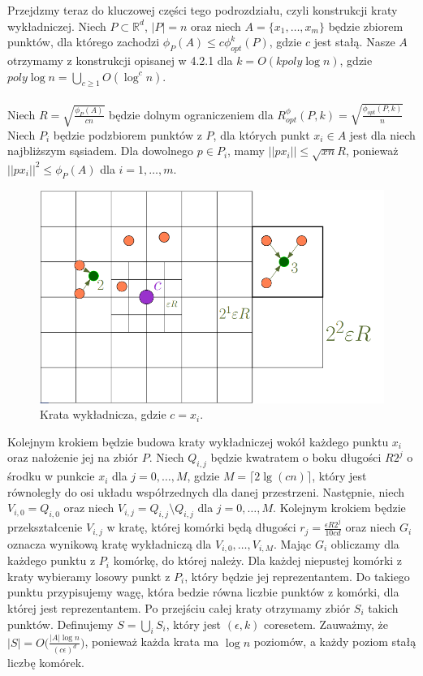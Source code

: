 Przejdzmy teraz do kluczowej części tego podrozdziału, czyli konstrukcji kraty wykładniczej.
Niech $P \subset \mathbb{R}^d$, $|P| = n$ oraz niech $A = \{x_{1}, \dots, x_{m}\}$ będzie zbiorem punktów, dla którego zachodzi $\phi_{P}(A) \leq c\phi_{opt}^{k}(P)$, gdzie $c$ jest stałą.
Nasze $A$ otrzymamy z konstrukcji opisanej w 4.2.1 dla $k = O(k poly \log n)$, gdzie $poly \log n = \bigcup_{c \geq 1} O(\log^{c}n)$.
\\~\\
Niech $R = \sqrt{\frac{\phi_{P}(A)}{cn}}$ będzie dolnym ograniczeniem dla $R_{opt}^{\phi}(P, k) = \sqrt{\frac{\phi_{opt}(P, k)}{n}}$
Niech $P_{i}$ będzie podzbiorem punktów z $P$, dla których punkt $x_{i} \in A$ jest dla niech najbliższym sąsiadem. 
Dla dowolnego $p \in P_{i}$, mamy $||px_{i}|| \leq \sqrt{xn}R$, ponieważ $||px_{i}||^{2} \leq \phi_{P}(A)$ dla $i = 1, \dots, m$.
\begin{figure}[H]
    \centering
    \includegraphics[totalheight=4cm]{grid.png}
    \caption{Krata wykładnicza, gdzie $c = x_{i}$.}
\end{figure}
\noindent
Kolejnym krokiem będzie budowa kraty wykładniczej wokół każdego punktu $x_{i}$ oraz nałożenie jej na zbiór $P$.
Niech $Q_{i,j}$ będzie kwatratem o boku długości $R2^{j}$ o środku w punkcie $x_{i}$ dla $j = 0, \dots, M$, gdzie $M = \lceil 2 \lg(cn) \rceil$, który jest równoległy do osi układu współrzednych dla danej przestrzeni.
Następnie, niech $V_{i, 0} = Q_{i, 0}$ oraz niech $V_{i,j} = Q_{i,j} \setminus Q_{i,j}$ dla $j = 0, \dots, M$.
Kolejnym krokiem będzie przekształcenie $V_{i,j}$ w kratę, której komórki będą długości $r_{j} = \frac{\epsilon R2^{j}}{10cd}$ oraz niech $G_{i}$ oznacza wynikową kratę wykładniczą dla $V_{i,0}, \dots, V_{i,M}$.
Mając $G_{i}$ obliczamy dla każdego punktu z $P_{i}$ komórkę, do której należy.
Dla każdej niepustej komórki z kraty wybieramy losowy punkt z $P_{i}$, który będzie jej reprezentantem.
Do takiego punktu przypisujemy wagę, która bedzie równa liczbie punktów z komórki, dla której jest reprezentantem.
Po przejściu całej kraty otrzymamy zbiór $S_{i}$ takich punktów.
Definujemy $S = \bigcup_{i} S_{i}$, który jest  $(\epsilon, k)$ coresetem.
Zauważmy, że $|S| = O\Big( \frac{|A| \log n }{ (c\epsilon)^{d} } \Big)$, ponieważ każda krata ma $\log n$ poziomów, a każdy poziom stałą liczbę komórek.

